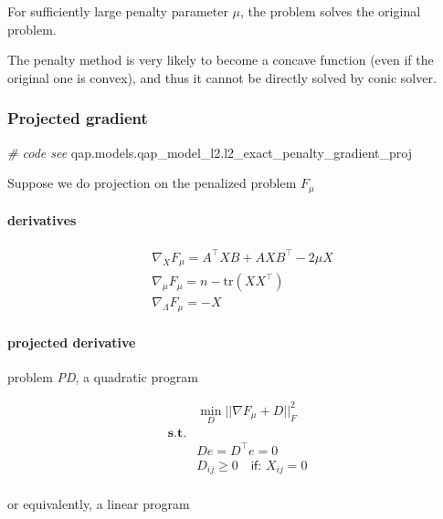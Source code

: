 \documentclass[
  10pt,
  a4paper,
,tablecaptionabove
]{scrartcl}
\newenvironment{Shaded}{}{}
\newcommand{\CommentTok}[1]{\textcolor[rgb]{0.38,0.63,0.69}{\textit{#1}}}
\newcommand{\NormalTok}[1]{#1}
\begin{document}
For sufficiently large penalty parameter \(\mu\), the problem solves the
original problem.

The penalty method is very likely to become a concave function (even if
the original one is convex), and thus it cannot be directly solved by
conic solver.

\hypertarget{projected-gradient}{%
\subsubsection{Projected gradient}\label{projected-gradient}}

\begin{Shaded}
\begin{Highlighting}[]
\CommentTok{\# code see}
\NormalTok{qap.models.qap\_model\_l2.l2\_exact\_penalty\_gradient\_proj}
\end{Highlighting}
\end{Shaded}

Suppose we do projection on the penalized problem \(F_\mu\)

\hypertarget{derivatives}{%
\paragraph{derivatives}\label{derivatives}}

\[\begin{aligned}
& \nabla_X F_\mu  = A^\top XB + AXB^\top - 2\mu X \\
& \nabla_\mu F_\mu  = n - \textrm{tr}(XX^\top) \\
& \nabla_\Lambda F_\mu  = - X
\end{aligned}\]

\hypertarget{projected-derivative}{%
\paragraph{projected derivative}\label{projected-derivative}}

problem \emph{PD}, a quadratic program

\[\begin{aligned}
&\min_D ||\nabla F_\mu + D ||_F^2  \\
\mathbf{s.t.} & \\
&D e = D^\top e = 0 \\ 
&D_{ij} \ge 0 \quad \textsf{if: } X_{ij} = 0\\
\end{aligned}\]

or equivalently, a linear program
\end{document}
